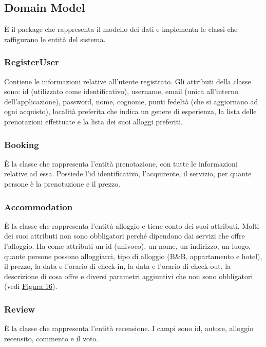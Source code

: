 \documentclass[10pt]{article}
\begin{document}
\subsection{Domain Model}

\`E il package che rappresenta il modello dei dati e implementa le classi che raffigurano le entità del sistema.

\subsubsection{RegisterUser}

Contiene le informazioni relative all'utente registrato. Gli attributi della classe sono: id (utilizzato come identificativo), username, email (unica all'interno dell'applicazione), password, nome, cognome, punti fedeltà (che si aggiornano ad ogni acquisto), località preferita che indica un genere di esperienza, la lista delle prenotazioni effettuate e la lista dei suoi alloggi preferiti. 

\subsubsection{Booking}

\`E la classe che rappresenta l'entità prenotazione, con tutte le informazioni relative ad essa. Possiede l'id identificativo, l'acquirente, il servizio, per quante persone è la prenotazione e il prezzo.

\subsubsection{Accommodation}

\`E la classe che rappresenta l'entità alloggio e tiene conto dei suoi attributi. Molti dei suoi attributi non sono obbligatori perché dipendono dai servizi che offre l'alloggio. Ha come attributi un id (univoco), un nome, un indirizzo, un luogo, quante persone possono alloggiarci, tipo di alloggio (B\&B, appartamento e hotel), il prezzo, la data e l'orario di check-in, la data e l'orario di check-out, la descrizione di cosa offre e diversi parametri aggiuntivi che non sono obbligatori (vedi \hyperref[fig:uml]{Figura 16}).

\subsubsection{Review}

\`E la classe che rappresenta l'entità recensione. I campi sono id, autore, alloggio recensito, commento e il voto.
\end{document}
